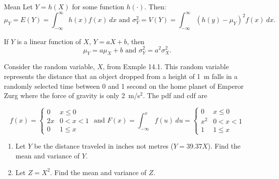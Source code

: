 \begin{frame}
  
  \begin{block}{Mean}
    Let $Y=h(X)$ for some function $h(\cdot)$. Then:
    \[
      \mu_Y=E(Y)=\int_{-\infty}^{\infty} h(x)f(x) ~dx
      \mbox{ and }
      \sigma^2_Y=V(Y)=\int_{-\infty}^{\infty}(h(y)-\mu_Y)^2 f(x)~dx.
    \]
    
    \bigskip
    
    If $Y$ is a linear function of $X$, $Y=aX+b$, then
    $$
    \mu_Y=a\mu_X+b
       \mbox{ and }
    \sigma^2_Y=a^2\sigma^2_X.
    $$
  \end{block}
\end{frame}

\begin{frame}
  \begin{block}{\examplectd}
    Consider the random variable, $X$, from Exmple 14.1. This random variable represents the distance that an object dropped from a height of 1~m falls in a randomly selected time between 0 and 1 second on the home planet of Emperor Zurg where the force of gravity is only 2~m/s$^2$. The pdf and cdf are
    \begin{scriptsize}
      \[
        f(x)=\left\{
          \begin{array}{ll}
            0 & x \leq 0\\
            2x & 0 < x < 1\\
          0 & 1 \leq x
          \end{array}
        \right.
        \mbox{ and }
        F(x)=\int_{-\infty}^x f(u)~du=
        \left\{
          \begin{array}{ll}
            0 & x \leq 0\\
            x^2 & 0 < x < 1\\
            1 & 1 \leq x
          \end{array}
        \right.
      \]
    \end{scriptsize}
  \end{block}
  
  \begin{enumerate}[label=\alph*),start=4]
  \item Let $Y$ be the distance traveled in inches not metres ($Y=39.37X$). Find the mean and variance of $Y$.
  \item Let $Z=X^2$. Find the mean and variance of $Z$. 
  \end{enumerate}
  
\end{frame}
